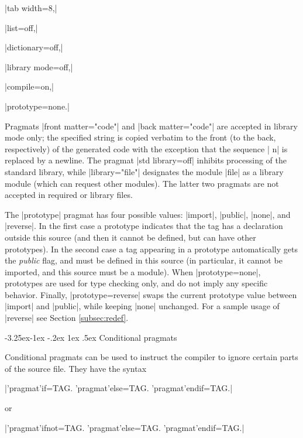 \documentclass[titlepage]{article}
\makeatletter
\newcommand\g[1]{\textsf{#1}}
\renewcommand\subsection{%
\@startsection{subsection}{2}{\z@}%
   {-3.25ex\@plus -1ex \@minus -.2ex}%
   {1ex \@plus .5ex}%
   {\normalfont\normalsize\bfseries}}
\makeatother
\begin{document}
\HH\pp|tab width=8,|\HE

\HH\pp|list=off,|\HE

\HH\pp|dictionary=off,|\HE

\HH\pp|library mode=off,|\HE

\HH\pp|compile=on,|\HE

\HH\pp|prototype=none.|\HE

\smallskip
Pragmats \pp|front matter="code"|  and \pp|back matter="code"| are accepted
in library mode only; the specified string is copied verbatim to the front
(to the back, respectively) of the generated code with the exception that
the sequence \pp| n| is replaced by a newline. The pragmat \pp|std
library=off| inhibits processing of the standard library, while
\pp|library="file"| designates the module \pp|file| as a library module
(which can request other modules). The latter two pragmats are not accepted
in required or library files.

The \pp|prototype| pragmat has four possible values: \pp|import|,
\pp|public|, \pp|none|, and \pp|reverse|. In the first case a \g{prototype}
indicates that the tag has a declaration outside this source (and then it
cannot be defined, but can have other prototypes). In the second case a tag
appearing in a \g{prototype} automatically gets the \emph{public} flag, and
must be defined in this source (in particular, it cannot be imported, and
this source must be a module). When
\pp|prototype=none|, prototypes are used for type checking only, and do
not imply any specific behavior. Finally, \pp|prototype=reverse| swaps the
current prototype value between \pp|import| and \pp|public|, while keeping
\pp|none| unchanged. For a sample usage of \pp|reverse| see Section
 \ref{subsec:redef}.


\subsection{Conditional pragmats}\label{conditional}

Conditional pragmats can be used to instruct the compiler to ignore certain
parts of the source file. They have the syntax

\medskip

\pp|'pragmat'if=TAG.     'pragmat'else=TAG.   'pragmat'endif=TAG.|

\noindent or

\pp|'pragmat'ifnot=TAG.  'pragmat'else=TAG.   'pragmat'endif=TAG.|
\end{document}
